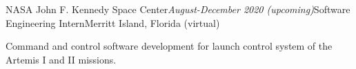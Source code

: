 \begin{rSubsection}{NASA John F. Kennedy Space Center}{\em August-December 2020 (upcoming)}{Software Engineering Intern}{Merritt Island, Florida (virtual)}
\item Command and control software development for launch control system of the Artemis I and II missions.
\end{rSubsection}
